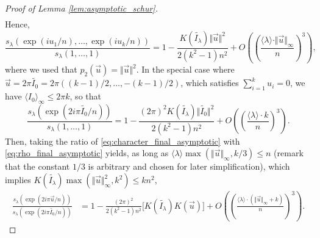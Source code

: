 \documentclass[10pt,11pt]{amsart}%
\begin{document}
\begin{proof}[Proof of Lemma \ref{lem:asymptotic_schur}]
\begin{align*}
\end{align*}
Hence, 
\begin{equation}\label{eq:character_final_asymptotic}
\frac{s_{\lambda}(\exp(iu_1/n),\ldots,\exp(iu_k/n))}{s_{\lambda}(1,\ldots,1)}=1-\frac{K(\widetilde{I_{\lambda}})\Vert \vec{u}\Vert^2}{2(k^2-1)n^2}+O\left(\left(\frac{\langle \lambda\rangle\cdot \Vert \vec{u}\Vert_\infty}{n}\right)^3\right),
\end{equation}
where we used that $p_2(\vec{u})=\Vert \vec{u}\Vert^2$. In the special case where $\vec{u}=2\pi \widetilde{I_0}=2\pi((k-1)/2,\ldots,-(k-1)/2)$, which satisfies $\sum_{i=1}^ku_i=0$, we have $\langle I_0\rangle_{\infty}\leq 2\pi k$, so that 
\begin{equation}\label{eq:rho_final_asymptotic}
\frac{s_{\lambda}(\exp(2i\pi \widetilde{I_0}/n))}{s_{\lambda}(1,\ldots,1)}=1-\frac{(2\pi)^2K(\widetilde{I_{\lambda}})\Vert \widetilde{I_0}\Vert^2}{2(k^2-1)n^2}+O\left(\left(\frac{\langle \lambda\rangle\cdot k}{n}\right)^3\right).
\end{equation}
Then, taking the ratio of \eqref{eq:character_final_asymptotic} with \eqref{eq:rho_final_asymptotic} yields, as long as $\langle \lambda\rangle\max(\Vert \vec{u}\Vert_\infty,k/3)\leq n$ (remark that the constant $1/3$ is arbitrary and chosen for later simplification), which implies $K(\widetilde{I_{\lambda}})\max(\Vert \vec{u}\Vert_\infty^2,k^2)\leq kn^2$, 
\begin{align*}
\frac{s_{\lambda}(\exp(2i\pi\vec{u}/n))}{s_{\lambda}(\exp(2i\pi \widetilde{I_0}/n))}&=1-\frac{(2\pi)^2}{2(k^2-1)n^2}\Big[K(\widetilde{I_{\lambda}})K(\vec{u})\Big]+O\left(\left(\frac{\langle \lambda\rangle\cdot (\Vert \vec{u}\Vert_\infty+k)}{n}\right)^3\right).
\end{align*}
\end{proof}
\end{document}
